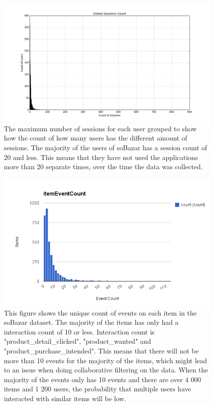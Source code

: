     \begin{figure}[H]
        \includegraphics[width=5in]{image/sessionsCount.png}
        \centering
        \caption[Total max session count for the users]{The maximum number of sessions for each user grouped to show how the count of how many users has the different amount of sessions.
        The majority of the users of soBazar has a session count of 20 and less.
        This means that they have not used the applications more than 20 separate times, over the time the data was collected.}
    \end{figure}


    \begin{figure}[H]
        \includegraphics[width=5in]{image/item-event-count.png}
        \centering
        \caption[Count of events on each unique item]{This figure shows the unique count of events on each item in the soBazar dataset.
        The majority of the items has only had a interaction count of 10 or less.
        Interaction count is "product\_detail\_clicked", "product\_wanted" and "product\_purchase\_intended".
        This means that there will not be more than 10 events for the majority of the items, which might lead to an issue when doing collaborative filtering on the data.
        When the majority of the events only has 10 events and there are over 4 000 items and 1 200 users, the probability that multiple users have interacted with similar items will be low.}
    \end{figure}


